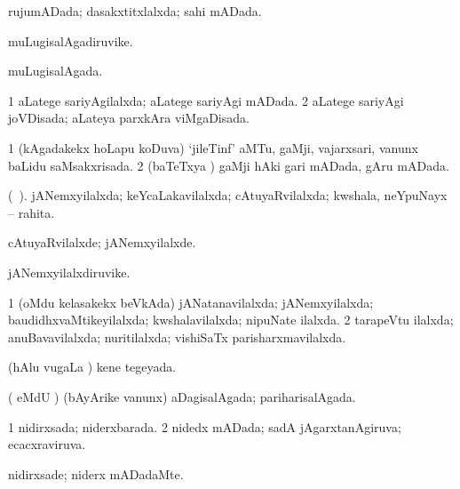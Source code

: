 \bentry
{} 
\gl{\gu}
\expl{}
\bmng
rujumADada; dasakxtitxlalxda; sahi mADada. 
\emng
\eentry

\bentry
{} 
\gl{\nA}
\expl{}
\bmng
muLugisalAgadiruvike. 
\emng
\eentry

\bentry
{} 
\gl{\gu}
\expl{}
\bmng
muLugisalAgada. 
\emng
\eentry

\bentry
{} 
\gl{\gu}
\expl{}
\bmng
\bnum
\num{1} aLatege sariyAgilalxda; aLatege sariyAgi mADada. 
\num{2} aLatege sariyAgi joVDisada; aLateya parxkAra viMgaDisada. 
\enum
\emng
\eentry

\bentry
{} 
\gl{\gu}
\expl{}
\bmng
\bnum
\num{1} (kAgadakekx hoLapu koDuva) `jileTinf' aMTu, gaMji, vajarxsari, \mo vanunx baLidu saMsakxrisada. 
\num{2} (baTeTxya \vi) gaMji hAki gari mADada, gAru mADada. 
\enum
\emng
\eentry

\bentry
{} 
\gl{\gu}
\expl{}
\bmng
(\ame\ ). jANemxyilalxda; keYcaLakavilalxda; cAtuyaRvilalxda; kwshala, neYpuNayx -- rahita. 
\emng
\eentry

\bentry
{} 
\gl{\kirxvi}
\expl{}
\bmng
cAtuyaRvilalxde; jANemxyilalxde. 
\emng
\eentry

\bentry
{} 
\gl{\nA}
\expl{}
\bmng
jANemxyilalxdiruvike. 
\emng
\eentry

\bentry
{} 
\gl{\gu}
\expl{}
\bmng
\bnum
\num{1} (oMdu kelasakekx beVkAda) jANatanavilalxda; jANemxyilalxda; baudidhxvaMtikeyilalxda; kwshalavilalxda; nipuNate ilalxda. 
\num{2} tarapeVtu ilalxda; anuBavavilalxda; nuritilalxda; vishiSaTx parisharxmavilalxda. 
\enum
\emng
\eentry

\bentry
{} 
\gl{\gu}
\expl{}
\bmng
(hAlu \mo vugaLa \vi) kene tegeyada. 
\emng
\eentry

\bentry
{} 
\gl{\gu}
\expl{}
\bmng
( eMdU \parx) (bAyArike \mo vanunx) aDagisalAgada; pariharisalAgada. 
\emng
\eentry

\bentry
{} 
\gl{\gu}
\expl{}
\bmng
\bnum
\num{1} nidirxsada; niderxbarada. 
\num{2} nidedx mADada; sadA jAgarxtanAgiruva; ecacxraviruva. 
\enum
\emng
\eentry

\bentry
{} 
\gl{\kirxvi}
\expl{}
\bmng
nidirxsade; niderx mADadaMte. 
\emng
\eentry

